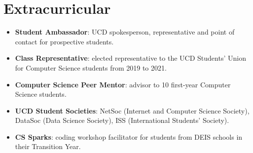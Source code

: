 \documentclass[letterpaper,11pt]{article}
\makeatletter
\newcommand{\resumeItem}[1]{
	\item\small{
		{#1 \vspace{-2pt}}
	}
}
\newcommand{\resumeProjectHeading}[2]{
	\item
	\begin{tabular*}{0.97\textwidth}{l@{\extracolsep{\fill}}r}
		\small#1 & #2 \\
	\end{tabular*}\vspace{-7pt}
}
\newcommand{\resumeSubHeadingListEnd}{\end{itemize}}
\newcommand{\resumeItemListStart}{\begin{itemize}}
\newcommand{\resumeItemListEnd}{\end{itemize}\vspace{-1pt}}
\newcommand{\resumeSimpleListStart}{\renewcommand\labelitemi{\tiny$\bullet$}\begin{itemize}[itemsep=1pt]}
\newcommand{\resumeSimpleListEnd}{\end{itemize}\vspace{-1pt}}
\makeatother
\begin{document}




\section{Extracurricular}

\resumeSimpleListStart
\resumeItem{\textbf{Student Ambassador}: UCD spokesperson, representative and point of contact for prospective students.}
\resumeItem{\textbf{Class Representative}: elected representative to the UCD Students’ Union for Computer Science students from 2019 to 2021.}
\resumeItem{\textbf{Computer Science Peer Mentor}: advisor to 10 first-year Computer Science students.}
\resumeItem{\textbf{UCD Student Societies}: NetSoc (Internet and Computer Science Society), DataSoc (Data Science Society), ISS (International Students' Society).}
\resumeItem{\textbf{CS Sparks}: coding workshop facilitator for students from DEIS schools in their Transition Year.}
\resumeSimpleListEnd


\end{document}
